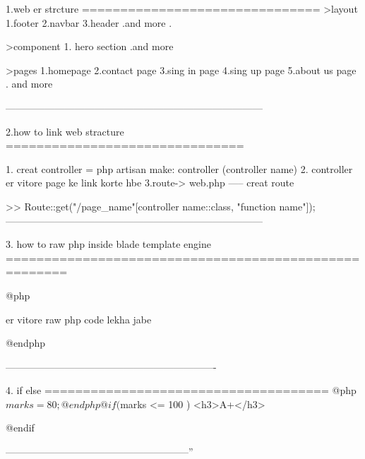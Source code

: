 
1.web er strcture
===============================
>layout
  1.footer
  2.navbar
  3.header
  .and more
  .

>component
 1. hero section
 .and more

>pages
 1.homepage
 2.contact page
 3.sing in page
 4.sing up page
 5.about us page
 . and more

------------------------------------------------------------------------------

2.how to link  web stracture
===============================

1. creat controller  =  php artisan make: controller (controller name)
2. controller er vitore page ke link korte hbe
3.route-> web.php ----- creat route

 >> Route::get("/page_name"[controller name::class, "function name"]);
------------------------------------------------------------------------------

3. how to raw php inside blade template engine
 ======================================================

@php

 er vitore raw php code lekha jabe

@endphp

----------------------------------------------------------------

4. if else
=====================================
@php
    $marks = 80;

@endphp

@if ($marks <= 100 )
   <h3>A+</h3>

@endif

--------------------------------------------------------''
